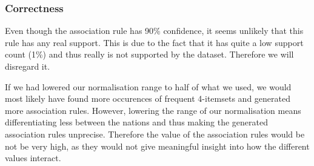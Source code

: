 \subsubsection*{Correctness}
\label{Res_FP_Cor}
Even though the association rule has 90\% confidence, it seems unlikely that this rule has any real support. This is due to the fact that it has quite a low support count (1\%) and thus really is not supported by the dataset. Therefore we will disregard it.

If we had lowered our normalisation range to half of what we used, we would most likely have found more occurences of frequent 4-itemsets and generated more association rules. However, lowering the range of our normalisation means differentiating less between the nations and thus making the generated association rules unprecise. Therefore the value of the association rules would be not be very high, as they would not give meaningful insight into how the different values interact.